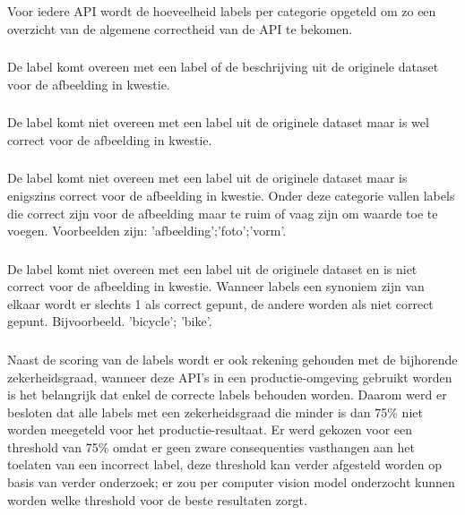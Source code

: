 Voor iedere API wordt de hoeveelheid labels per categorie opgeteld om zo een overzicht van de algemene correctheid van de API te bekomen.

\subsubsection{}
\label{sec:completely-correct}
De label komt overeen met een label of de beschrijving uit de originele dataset voor de afbeelding in kwestie.

\subsubsection{}
\label{sec:correct}
De label komt niet overeen met een label uit de originele dataset maar is wel correct voor de afbeelding in kwestie.

\subsubsection{}
\label{sec:somewhat-correct}
De label komt niet overeen met een label uit de originele dataset maar is enigszins correct voor de afbeelding in kwestie. Onder deze categorie vallen labels die correct zijn voor de afbeelding maar te ruim of vaag zijn om waarde toe te voegen. Voorbeelden zijn: 'afbeelding';'foto';'vorm'.

\subsubsection{}
\label{sec:not-correct}
De label komt niet overeen met een label uit de originele dataset en is niet correct voor de afbeelding in kwestie. Wanneer labels een synoniem zijn van elkaar wordt er slechts 1 als correct gepunt, de andere worden als niet correct gepunt.
Bijvoorbeeld. 'bicycle'; 'bike'.


\subsubsection{}
\label{sec:scoring-thresholding}
Naast de scoring van de labels wordt er ook rekening gehouden met de bijhorende zekerheidsgraad, wanneer deze API's in een productie-omgeving gebruikt worden is het belangrijk dat enkel de correcte labels behouden worden. Daarom werd er besloten dat alle labels met een zekerheidsgraad die minder is dan 75\% niet worden meegeteld voor het productie-resultaat. Er werd gekozen voor een threshold van 75\% omdat er geen zware consequenties vasthangen aan het toelaten van een incorrect label, deze threshold kan verder afgesteld worden op basis van verder onderzoek; er zou per computer vision model onderzocht kunnen worden welke threshold voor de beste resultaten zorgt.

